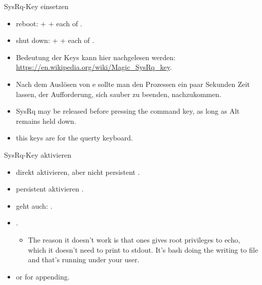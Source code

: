 \begin{frame}[fragile]{SysRq-Key einsetzen}
  \begin{itemize}
    \item \alert{reboot:}  +  + each of .
    \item \alert{shut down:}  +  + each of .
    \item Bedeutung der Keys kann hier nachgelesen werden: \url{https://en.wikipedia.org/wiki/Magic_SysRq_key}.
  \end{itemize}
  \begin{Sidenote}
    \begin{itemize}
      \item Nach dem Auslösen von e sollte man den Prozessen ein paar Sekunden Zeit lassen, der Aufforderung, sich sauber zu beenden, nachzukommen.
      \item SysRq may be released before pressing the command key, as long as Alt remains held down.
      \item this keys are for the querty keyboard.
    \end{itemize}
  \end{Sidenote}
\end{frame}

\begin{frame}[fragile]{SysRq-Key aktivieren}
  \begin{itemize}
    \item \alert{direkt aktivieren, aber nicht persistent} {\tiny {}}.
    \item \alert{persistent aktivieren} {\tiny {}.}
  \end{itemize}
  \begin{Sidenote}
    \begin{itemize}
      \scriptsize
      \item \alert{geht auch:} {\tiny {\tiny {}}}.
      \item {\tiny {}}.
      \begin{itemize}
        \item The reason it doesn't work is that ones gives root privileges to echo, which it doesn't need to print to stdout. It's bash doing the writing to file and that's running under your user.
      \end{itemize}
      \item {} or \inlinebox{>>} for appending.
    \end{itemize}
  \end{Sidenote}
\end{frame}

